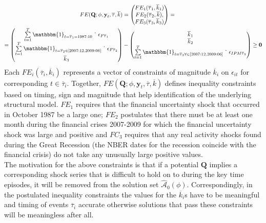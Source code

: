 \documentclass[a4paper,11pt,listof=nochaptergap,oneside,pointednumbers,bibtotoc,bigheadings,liststotoc,hidelinks]{scrbook}
\theoremstyle{mysatz}
\theoremstyle{mydefinition}
\theoremstyle{mytheorem}
\theoremstyle{mybemerkung}
\let\oldhat\hat
\newcommand{\vect}[1]{\boldsymbol{\mathbf{#1}}}
\newcommand{\hatt}[1]{\oldhat{\boldsymbol{\mathbf{#1}}}}
\begin{document}
\begin{equation} \label{eq:svar_ludvi12}
\begin{split}
	FE(\vect{Q}; \phi, \vect{y}_t, \overline{\tau}, \overline{k}) & = \begin{pmatrix}
	FE_1(\overline{\tau}_1, \overline{k}_1)\\
	 FE_2(\overline{\tau}_2, \overline{k}), \\
	 FE_3(\overline{\tau}_3, \overline{k}_3)
	\end{pmatrix} = \\
	= \begin{pmatrix}
	\sum\limits_{t=1}^T \mathbbm{1}_{t = \overline{\tau}_1= 1987:10} \dot \quad \epsilon_{F\overline{\tau}_1}  \\
	 \sum\limits_{t=1}^T \mathbbm{1}_{t = \overline{\tau}_2 \in [2007:12, 2009:06]} \dot \quad \epsilon_{F\overline{\tau}_2}  \\
	\overline{k}_3
	\end{pmatrix} & - 
	\begin{pmatrix}
	\overline{k}_1\\
	\overline{k}_2  \\
	\sum\limits_{t=1}^T \mathbbm{1}_{t = \overline{\tau}_3 \forall \in [2007:12, 2009:06]} \dot \quad \epsilon_{IPM\overline{\tau}_3} 
	\end{pmatrix} \geq \vect{0}
\end{split}								
\end{equation}
Each $FE_i(\overline{\tau}_i, \overline{k}_i)$ represents a vector of constraints of magnitude $\overline{k}_i$ on $\epsilon_{it}$ for corresponding $t \in \overline{\tau}_i$. Together, $FE(\vect{Q}; \phi, \vect{y}_t, \overline{\tau}, \overline{k})$ defines inequality constraints based on timing, sign and magnitude that help identification of the underlying structural model. $FE_1$ requires that the financial uncertainty shock that occurred in October 1987 be a large one; $FE_2$ postulates that there must be at least one month during the financial crises 2007-2009 for which the financial uncertainty shock was large and positive and $FC_3$ requires that any real activity shocks found during the Great Recession (the NBER dates for the recession coincide with the financial crisis) do not take any unusually large positive values.\\
The motivation for the above constraints is that if a potential $\vect{Q}$ implies a corresponding shock series that is difficult to hold on to during the key time episodes, it will be removed from the solution set $\hatt{\mathcal{A}}_0(\phi)$. Correspondingly, in the postulated inequality constraints the values for the $\overline{k}_i$s have to be meaningful and timing of events $\overline{\tau}_i$ accurate otherwise solutions that pass these constraints will be meaningless after all.
\end{document}
